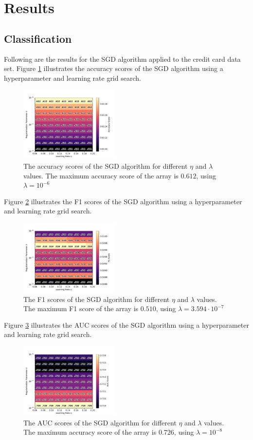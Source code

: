 \section{Results}
    \subsection{Classification}
		Following are the results for the SGD algorithm applied to the credit card data set. Figure \ref{fig:SGDacc} illustrates the accuracy scores of the SGD algorithm using a hyperparameter and learning rate grid search.
		\begin{figure}[H]
			\centering
			\includegraphics[width=0.45\textwidth]{figures/SGD_acc.pdf}
			\caption{The accuracy scores of the SGD algorithm for different $\eta$ and $\lambda$ values. The maximum accuracy score of the array is $0.612$, using $\lambda=10^{-6}$}
			\label{fig:SGDacc}
		\end{figure}
		Figure \ref{fig:SGDf1} illustrates the F1 scores of the SGD algorithm using a hyperparameter and learning rate grid search.
		\begin{figure}[H]
			\centering
			\includegraphics[width=0.45\textwidth]{figures/SGD_F1.pdf}
			\caption{The F1 scores of the SGD algorithm for different $\eta$ and $\lambda$ values. The maximum F1 score of the array is $0.510$, using $\lambda=3.594\cdot10^{-7}$}
			\label{fig:SGDf1}
		\end{figure}
		Figure \ref{fig:SGDauc} illustrates the AUC scores of the SGD algorithm using a hyperparameter and learning rate grid search.
		\begin{figure}[H]
			\centering
			\includegraphics[width=0.45\textwidth]{figures/SGD_AUC.pdf}
			\caption{The AUC scores of the SGD algorithm for different $\eta$ and $\lambda$ values. The maximum accuracy score of the array is $0.726$, using $\lambda=10^{-8}$}
			\label{fig:SGDauc}
		\end{figure}
